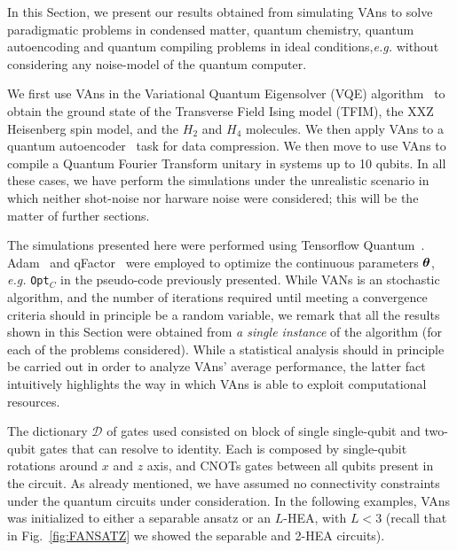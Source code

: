 In this Section, we present our results obtained from simulating VAns to solve paradigmatic problems in condensed matter, quantum chemistry, quantum autoencoding and quantum compiling problems in ideal conditions,\textit{e.g.} without considering any noise-model of the quantum computer.

We first use VAns in the Variational Quantum Eigensolver (VQE) algorithm~\cite{peruzzo2014variational} to obtain the ground state of the Transverse Field Ising model (TFIM), the XXZ Heisenberg spin model, and the $H_2$ and $H_4$ molecules. We then apply VAns to a quantum autoencoder~\cite{romero2017quantum} task for data compression. We then move to use VAns to compile a Quantum Fourier Transform unitary in systems up to 10 qubits. In all these cases, we have perform the simulations under the unrealistic scenario in which neither shot-noise nor harware noise were considered; this will be the matter of further sections. %

The simulations presented here were performed using Tensorflow Quantum~\cite{broughton2020tensorflow}. Adam~\cite{kingma2015adam} and qFactor~\cite{qFactor} were employed to optimize the continuous parameters $\bm{\theta}$, \textit{e.g.} \texttt{Opt}$_C$ in the pseudo-code previously presented. While VANs is an stochastic algorithm, and the number of iterations required until meeting a convergence criteria should in principle be a random variable, we remark that all the results shown in this Section were obtained from \textit{a single instance} of the algorithm (for each of the problems considered). While a statistical analysis should in principle be carried out in order to analyze VAns' average performance, the latter fact intuitively highlights the way in which VAns is able to exploit computational resources.

The dictionary $\mathcal{D}$ of gates used consisted on block of single single-qubit and two-qubit gates that can resolve to identity. Each is composed by single-qubit rotations around $x$ and $z$ axis, and CNOTs gates between all qubits present in the circuit. As already mentioned, we have assumed no connectivity constraints under the quantum circuits under consideration. In the following examples, VAns was initialized to either a separable ansatz or an $L$-HEA, with $L<3$ (recall that in Fig.~\ref{fig:FANSATZ} we showed the separable and 2-HEA circuits).
